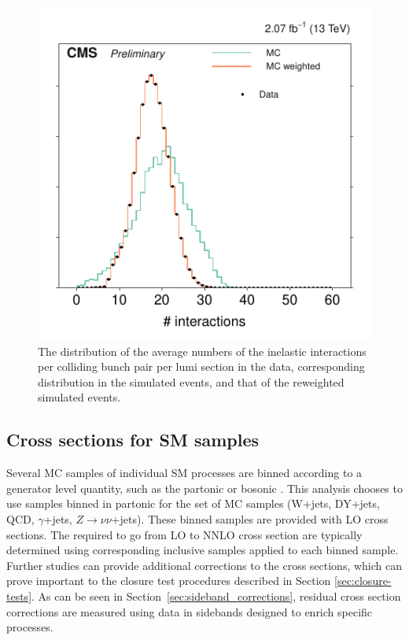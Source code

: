 \begin{figure}[!b]
\centering
\includegraphics[scale=1.00]{figures/pileup_reweighting/f044_corr_nTrueInt_data_mc_norm}
\caption{The distribution of the average numbers of the inelastic
interactions per colliding bunch pair per lumi section in the data,
corresponding distribution in the simulated events, and that of the
reweighted simulated events.} \label{f044_corr_nTrueInt_data_mc_norm}
\end{figure}


\subsection{Cross sections for SM samples}
\label{sec:SMxs}
Several MC samples of individual SM processes are binned according to a generator level quantity, 
such as the partonic \HT or bosonic \PT.
This analysis chooses to use samples binned in partonic \HT 
for the set of MC samples (W+jets, DY+jets, QCD, $\gamma$+jets, $Z\rightarrow \nu\nu$+jets).
These binned samples are provided with LO cross sections. 
The \kfactors required to go from LO to NNLO cross section are typically determined using corresponding
inclusive samples applied to each \HT binned sample.
Further studies can provide additional corrections to the cross sections, 
which can prove important to the closure test procedures described in
Section \ref{sec:closure-tests}. As can be seen in Section~\ref{sec:sideband_corrections}, residual cross section
corrections are measured using data in sidebands designed to enrich specific processes.

